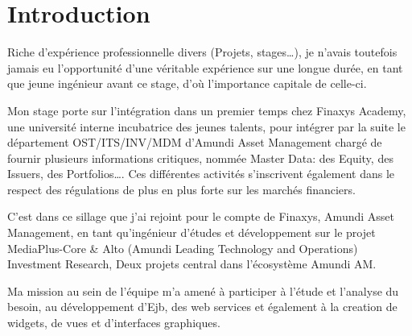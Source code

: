 \chapter*{Introduction}
Riche d’expérience professionnelle divers (Projets, stages\dots), je n’avais  toutefois jamais eu l’opportunité d’une véritable expérience sur une longue  durée, en tant que jeune ingénieur avant ce stage, d’où l’importance capitale  de celle-ci. \\
\par Mon stage porte sur l’intégration dans un premier temps chez Finaxys  Academy, une université interne incubatrice des jeunes talents, pour intégrer  par la suite le département OST/ITS/INV/MDM d'Amundi Asset Management chargé de fournir plusieurs informations critiques, nommée Master Data: des Equity, des Issuers, des Portfolios\dots . Ces différentes activités  s’inscrivent également dans le respect des régulations de plus en plus forte sur  les marchés financiers. \\
\par C’est dans ce sillage que j’ai rejoint pour le compte de Finaxys, Amundi Asset Management, en tant qu’ingénieur  d’études et développement sur le projet MediaPlus-Core \& Alto (Amundi Leading Technology and Operations) Investment Research, Deux projets central dans l'écosystème Amundi AM. \\
\par Ma mission au sein de l’équipe m’a amené à participer à l’étude et l’analyse  du besoin, au développement d'Ejb, des web services et également à la creation de widgets, de vues et d'interfaces graphiques.